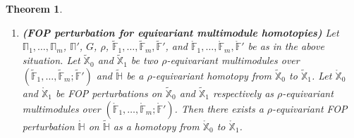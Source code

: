 \documentclass[reqno, 10pt]{amsart}
\numberwithin{equation}{section}
\numberwithin{equation}{section}
\newtheorem{thma}{Theorem}
\theoremstyle{definition}
\theoremstyle{remark}
\newcommand{\mb}{\mathbb}
\begin{document}
\begin{thma}
\begin{enumerate}
\item {\bf (FOP perturbation for equivariant multimodule homotopies)} Let $\mb\Pi_1, \ldots, \mb\Pi_m$, $\mb\Pi'$, $G$, $\rho$, $\tilde {\mb F}_1, \ldots, \tilde {\mb F}_m, \tilde {\mb F}'$, and $\mathring {\mb F}_1, \ldots, \mathring {\mb F}_m, \mathring {\mb F}'$ be as in the above situation. Let $\tilde {\mb X}_0$ and $\tilde {\mb X}_1$ be two $\rho$-equivariant multimodules over $(\tilde {\mb F}_1, \ldots, \tilde {\mb F}_m; \tilde {\mb F}')$ and $\tilde {\mb H}$ be a $\rho$-equivariant homotopy from $\tilde {\mb X}_0$ to $\tilde {\mb X}_1$. Let $\mathring {\mb X}_0$ and $\mathring {\mb X}_1$ be FOP perturbations on $\tilde {\mb X}_0$ and $\tilde {\mb X}_1$ respectively as $\rho$-equivariant multimodules over $(\mathring {\mb F}_1, \ldots, \mathring {\mb F}_m; \mathring {\mb F}')$. Then there exists a $\rho$-equivariant FOP perturbation $\mathring {\mb H}$ on $\tilde {\mb H}$ as a homotopy from $\mathring {\mb X}_0$ to $\mathring {\mb X}_1$.
\end{enumerate}
\end{thma}
\end{document}
